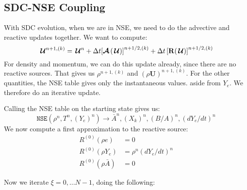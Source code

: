 \documentclass[times,modern]{aastex63}
\newcommand{\Ub}{\mathbf{U}}
\newcommand{\Uc}{{\,\bm{\mathcal{U}}}}
\newcommand{\Rb}{{\bf R}}
\newcommand{\Adv}[1]{{\left [\boldsymbol{\mathcal{A}} \left(#1\right)\right]}}
\newcommand{\nse}[1]{{\mathtt{NSE}( #1 )}}
\begin{document}
\subsection{SDC-NSE Coupling}

With SDC evolution, when we are in NSE, we need to do the advective
and reactive updates together.  We want to compute:
\begin{equation}
\Uc^{n+1,(k)} = \Uc^n + \Delta t \Adv{\Uc}^{n+1/2,(k)} + \Delta t \left [\Rb (\Uc) \right ]^{n+1/2,(k)}
\end{equation}
For density and momentum, we can do this update already, since there
are no reactive sources.  That gives us $\rho^{n+1,(k)}$ and $(\rho
\Ub)^{n+1,(k)}$.  For the other quantities, the NSE table gives only the
instantaneous values. aside from $Y_e$.  We therefore do an iterative
update.

Calling the NSE table on the starting state gives us:
\begin{equation}
\nse{\rho^n, T^n, (Y_e)^n} \rightarrow \bar{A}^n, (X_k)^n, (B/A)^n, (dY_e/dt)^n
\end{equation}
We now compute a first approximation to the reactive source:
\begin{align}
R^{(0)}(\rho e) &= 0 \\
R^{(0)}(\rho Y_e) &= \rho^n (dY_e/dt)^n \\
R^{(0)}(\rho \bar{A}) &= 0
\end{align}

Now we iterate $\xi = 0, \ldots N-1$, doing the following:
\end{document}
